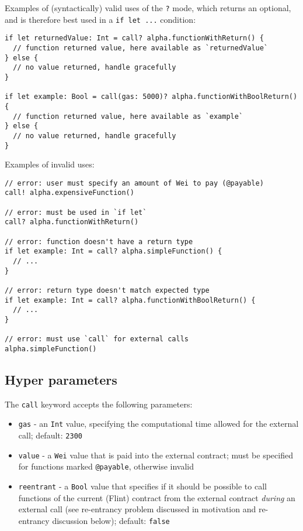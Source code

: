 Examples of (syntactically) valid uses of the \texttt{?} mode, which returns an optional, and is therefore best used in a \texttt{if let ...} condition:

\begin{verbatim}
if let returnedValue: Int = call? alpha.functionWithReturn() {
  // function returned value, here available as `returnedValue`
} else {
  // no value returned, handle gracefully
}

if let example: Bool = call(gas: 5000)? alpha.functionWithBoolReturn() {
  // function returned value, here available as `example`
} else {
  // no value returned, handle gracefully
}
\end{verbatim}

Examples of invalid uses:

\begin{verbatim}
// error: user must specify an amount of Wei to pay (@payable)
call! alpha.expensiveFunction()

// error: must be used in `if let`
call? alpha.functionWithReturn()

// error: function doesn't have a return type
if let example: Int = call? alpha.simpleFunction() {
  // ...
}

// error: return type doesn't match expected type
if let example: Int = call? alpha.functionWithBoolReturn() {
  // ...
}

// error: must use `call` for external calls
alpha.simpleFunction()
\end{verbatim}

\subsection{Hyper parameters}

The \texttt{call} keyword accepts the following parameters:

\begin{itemize}
	\item \texttt{gas} - an \texttt{Int} value, specifying the computational time allowed for the external call; default: \texttt{2300}
	\item \texttt{value} - a \texttt{Wei} value that is paid into the external contract; must be specified for functions marked \texttt{@payable}, otherwise invalid
	\item \texttt{reentrant} - a \texttt{Bool} value that specifies if it should be possible to call functions of the current (Flint) contract from the external contract \textit{during} an external call (see re-entrancy problem discussed in motivation and re-entrancy discussion below); default: \texttt{false}
\end{itemize}

